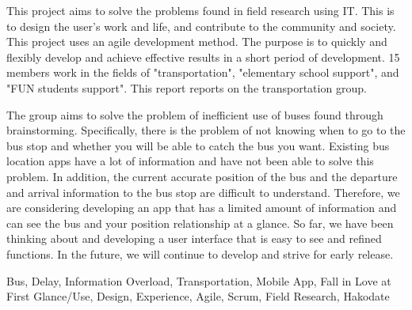 \documentclass[openany,11pt,papersize,dvipdfm]{jsbook}
\begin{document}
\begin{eabstract}
This project aims to solve the problems found in field research using IT. This is to design the user's work and life, and contribute to the community and society. This project uses an agile development method. The purpose is to quickly and flexibly develop and achieve effective results in a short period of development. 15 members work in the fields of "transportation", "elementary school support", and "FUN students support". This report reports on the transportation group.

The group aims to solve the problem of inefficient use of buses found through brainstorming. Specifically, there is the problem of not knowing when to go to the bus stop and whether you will be able to catch the bus you want. Existing bus location apps have a lot of information and have not been able to solve this problem. In addition, the current accurate position of the bus and the departure and arrival information to the bus stop are difficult to understand. Therefore, we are considering developing an app that has a limited amount of information and can see the bus and your position relationship at a glance. So far, we have been thinking about and developing a user interface that is easy to see and refined functions. In the future, we will continue to develop and strive for early release.
\begin{ekeyword}
Bus, Delay, Information Overload, Transportation, Mobile App, Fall in Love at First Glance/Use, Design, Experience, Agile, Scrum, Field Research, Hakodate
\end{ekeyword}
\end{eabstract}

\tableofcontents

\mainmatter





\end{document}
